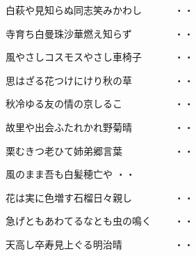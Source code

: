 \vspace{0.6cm}
\begin{shiika}白萩や見知らぬ同志笑みかわし　　　
\hfill{・・}\end{shiika}
\vspace{0.6cm}
\begin{shiika}寺育ち白曼珠沙華燃え知らず　　　　
\hfill{・・}\end{shiika}
\vspace{0.6cm}
\begin{shiika}風やさしコスモスやさし車椅子　　　
\hfill{・・}\end{shiika}
\vspace{0.6cm}
\begin{shiika}思はざる花つけにけり秋の草　　　　
\hfill{・・}\end{shiika}
\vspace{0.6cm}
\begin{shiika}秋冷ゆる友の情の京しるこ　　　　　
\hfill{・・}\end{shiika}
\vspace{0.6cm}
\begin{shiika}故里や出会ふたれかれ野菊晴　　　　
\hfill{・・}\end{shiika}
\vspace{0.6cm}
\begin{shiika}栗むきつ老ひて姉弟郷言葉　　　　　
\hfill{・・}\end{shiika}
\vspace{0.6cm}
\begin{shiika}風のまま吾も白髪穂亡や
\hfill{・・}\end{shiika}
\vspace{0.6cm}
\begin{shiika}花は実に色増す石榴日々親し　　　　
\hfill{・・}\end{shiika}
\vspace{0.6cm}
\begin{shiika}急げともあわてるなとも虫の鳴く　　
\hfill{・・}\end{shiika}
\vspace{0.6cm}
\begin{shiika}天高し卒寿見上ぐる明治晴　　　　　
\hfill{・・}\end{shiika}
